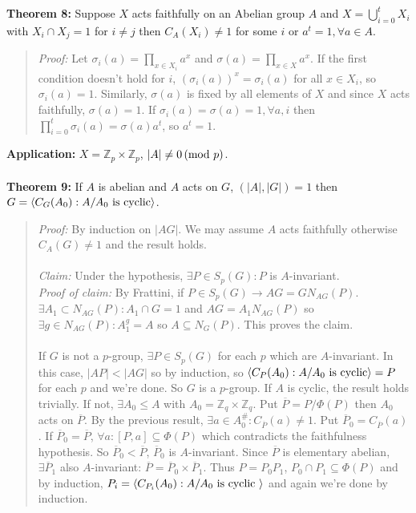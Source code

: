 \\
\\
{\bf Theorem 8:}
Suppose $X$ acts faithfully on an Abelian group $A$ and $X= \bigcup_{i=0}^t X_i$ with $X_i \cap X_j =1$ for $i \ne j$ then $C_A(X_i) \ne 1$ for some $i$ or
$a^t=1, \forall a \in A$.
\begin{quote}
\emph{Proof:} Let $\sigma_i(a)= \prod_{x \in X_i} a^x$ and
$\sigma(a)= \prod_{x \in X} a^x$.  If the first condition doesn't hold for $i$, $(\sigma_i(a))^x = \sigma_i(a)$ for
all $x \in X_i$, so $\sigma_i(a) = 1$.  Similarly, $\sigma(a)$ is fixed
by all elements of $X$ and since $X$ acts faithfully, $\sigma(a) = 1$.
If $\sigma_i(a)=\sigma(a)= 1, \forall a, i$ then
$\prod_{i=0}^t \sigma_i(a)= \sigma(a) a^t$, so $a^t=1$.
\end{quote}
{\bf Application:} $X= {\mathbb Z}_p \times {\mathbb Z}_p$, $|A| \ne 0 \thinspace \textnormal{(mod } p \textnormal{)}$.
\\
\\
{\bf Theorem 9:}
If $A$ is abelian and $A$ acts on $G$, $(|A|, |G|)=1$ then $G= \langle C_G(A_0): A/A_0 \textnormal{ is cyclic} \rangle $.
\begin{quote}
\emph{Proof:} By induction on $|AG|$.  We may assume $A$ acts faithfully otherwise $C_A(G) \ne 1$ and
the result holds.  \\
\\
\emph{Claim:} Under the hypothesis, $\exists P \in S_p(G): P$ is
$A$-invariant. \\
\emph{Proof of claim:}  By Frattini, if $P \in S_p(G) \rightarrow AG=GN_{AG}(P)$.
$\exists A_1 \subset N_{AG}(P): A_1 \cap G=1$ and $AG = A_1 N_{AG}(P)$ so $\exists g \in N_{AG}(P):
A_1^g=A$ so $A \subseteq N_G(P)$.   This proves the claim.
\\
\\
If $G$ is not a $p$-group, $\exists P \in S_p(G)$ for each $p$ which are $A$-invariant.  In
this case, $|AP|<|AG|$ so by induction,
so $ \langle C_P(A_0): A/A_0 \textnormal{ is cyclic}  \rangle =P$ for each $p$ and we're done.
So $G$ is a $p$-group.  If $A$ is cyclic, the result holds trivially.  If not, $\exists A_0
\leq  A$ with $A_0= {\mathbb Z}_q \times {\mathbb Z}_q$. Put ${\overline P}= P/\Phi(P)$ then
$A_0$ acts on ${\overline P}$.  By the previous result,
$\exists a \in A_0^{\#}: C_{\overline P}(a) \ne 1$.  Put
${\overline P}_0= C_{\overline P}(a)$.
If ${\overline P}_0={\overline P}$, $\forall a: [P, a] \subseteq \Phi (P)$ which contradicts
the faithfulness hypothesis.  So ${\overline P}_0 < {\overline P}$, ${\overline P}_0$ is
$A$-invariant.  Since ${\overline P}$ is elementary abelian, $\exists {\overline P}_1$
also $A$-invariant: ${\overline P}= {\overline P}_0 \times {\overline P}_1$.  Thus
$P= P_0 P_1$, $P_0 \cap P_1 \subseteq \Phi (P)$ and by induction,
$P_i= \langle C_{P_i}(A_0): A/A_0 \textnormal{ is cyclic } \rangle $ and again we're done by induction.
\end{quote}
